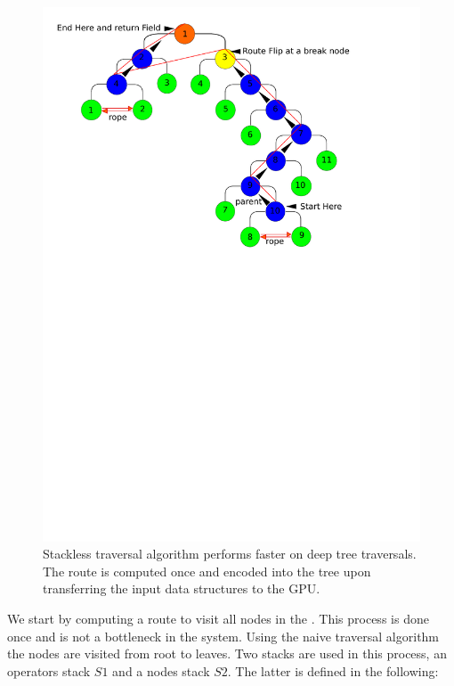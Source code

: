 \begin{figure}[H]
  \centering
  \includegraphics[width=1.0\linewidth]{figures/gpupoly/stackless.pdf}
  \caption{\label{fig:stackless}
  {Stackless \blob traversal algorithm performs faster on deep tree traversals. The route is computed once and encoded into the tree upon transferring the input 
  data structures to the GPU.}
}
\end{figure}

We start by computing a route to visit all nodes in the \blob. This process is done once and is not a bottleneck in the system.
Using the naive \blob traversal algorithm the nodes are visited from root to leaves. Two stacks are used in this process, an
operators stack $S1$ and a  nodes stack $S2$. The latter is defined in the following:

